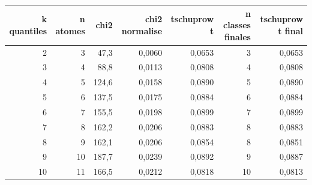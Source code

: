 \begin{tabular}{rrrrrrr}
\toprule
\textbf{k quantiles} & \textbf{n atomes} & \textbf{chi2} & \textbf{chi2 normalise} & \textbf{tschuprow t} & \textbf{n classes finales} & \textbf{tschuprow t final} \\
\midrule
2 & 3 & 47,3 & 0,0060 & 0,0653 & 3 & 0,0653 \\
3 & 4 & 88,8 & 0,0113 & 0,0808 & 4 & 0,0808 \\
4 & 5 & 124,6 & 0,0158 & 0,0890 & 5 & 0,0890 \\
5 & 6 & 137,5 & 0,0175 & 0,0884 & 6 & 0,0884 \\
6 & 7 & 155,5 & 0,0198 & 0,0899 & 7 & 0,0899 \\
7 & 8 & 162,2 & 0,0206 & 0,0883 & 8 & 0,0883 \\
8 & 9 & 162,1 & 0,0206 & 0,0854 & 8 & 0,0851 \\
9 & 10 & 187,7 & 0,0239 & 0,0892 & 9 & 0,0887 \\
10 & 11 & 166,5 & 0,0212 & 0,0818 & 10 & 0,0813 \\
\bottomrule
\end{tabular}
